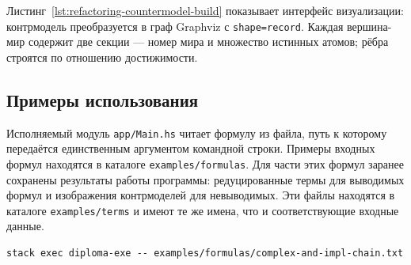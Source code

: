 \documentclass[14pt, russian]{scrartcl}
\begin{document}
Листинг~\ref{lst:refactoring-countermodel-build} показывает интерфейс
визуализации: контрмодель преобразуется в граф Graphviz с \texttt{shape=record}.
Каждая вершина-мир содержит две секции --- номер мира и множество истинных
атомов; рёбра строятся по отношению достижимости.

\subsection{Примеры использования}

Исполняемый модуль \texttt{app/Main.hs} читает формулу из файла, путь к которому
передаётся единственным аргументом командной строки. Примеры входных формул
находятся в каталоге \texttt{examples/formulas}. Для части этих формул заранее
сохранены результаты работы программы: редуцированные термы для выводимых формул
и изображения контрмоделей для невыводимых. Эти файлы находятся в каталоге
\texttt{examples/terms} и имеют те же имена, что и соответствующие входные
данные.

\begin{listing}[!htb]
\caption{Запуск программы на файле с формулой}
\label{lst:usage-command}
\begin{verbatim}
stack exec diploma-exe -- examples/formulas/complex-and-impl-chain.txt
\end{verbatim}
\end{listing}
\end{document}
